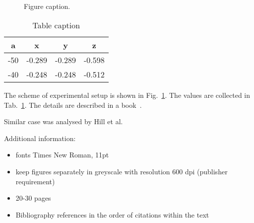 \documentclass[b5paper, 11pt, openany, titlepage]{book}
\begin{document}
\subsection{}
\subsection{}

\begin{figure} [h!]
	\begin{center}
	\end{center}
	\caption{Figure caption.} 
	\label{fig:bc}
\end{figure}

\begin{table}[h]
\centering
	\caption{Table caption}
	\begin{tabular}{cccc}
		\hline
	\textbf{a}	& \textbf{x} & \textbf{y} & \textbf{z} \\
		\hline
		-50 & -0.289 & -0.289 & -0.598\\ 
		-40 & -0.248 & -0.248 & -0.512\\ 
		\hline 
	\end{tabular} 
	\label{tab:xyz}
\end{table}

The scheme of experimental setup is shown in Fig.~\ref{fig:bc}.  
The values are collected in Tab.~\ref{tab:xyz}.
The details are described in a book~\cite{udd2011fiber}. 

Similar case was analysed by Hill et al.~\cite{hill1978photosensitivity}

Additional information:
\begin{itemize}
\item fonts Times New Roman, 11pt
\item keep figures separately in greyscale with resolution 600 dpi (publisher requirement)
\item 20-30 pages
\item Bibliography references in the order of citations within the text
\end{itemize}


 
 


\end{document}
